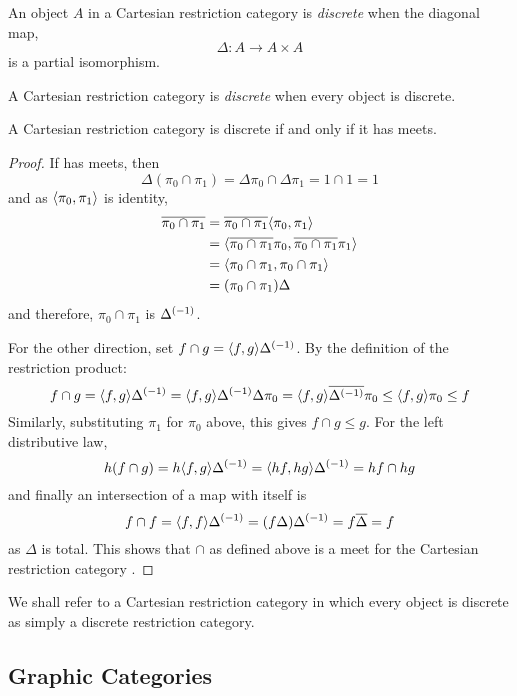 \begin{definition}
  An object $A$ in a Cartesian restriction category is \emph{discrete}
  when the diagonal map,
  \[
    \Delta:A \to A \times A
  \]
  is a partial isomorphism.

  A Cartesian restriction category is \emph{discrete} when every object is discrete.
\end{definition}

\begin{theorem}\label{thm:a_crc_is_discrete_iff_it_has_meets}
  A Cartesian restriction category \X is discrete if and only if it has meets.
\end{theorem}
\begin{proof}
  If \X has meets, then
  \[
    \Delta(\pi_0 \cap \pi_1) = \Delta\pi_0 \cap \Delta\pi_1 = 1\cap 1 = 1
  \]
  and as $\langle\pi_0,\pi_1\rangle$ is identity,
  \begin{align*}
    \overline{\pi_0 \cap \pi_1} &= \overline{\pi_0 \cap \pi_1} \langle\pi_0, \pi_1\rangle \\
    &=\langle\overline{\pi_0 \cap \pi_1}\pi_0, \overline{\pi_0 \cap \pi_1}\pi_1\rangle\\
    &=\langle\pi_0 \cap \pi_1,\pi_0 \cap \pi_1\rangle\\
    &=(\pi_0 \cap \pi_1 )\Delta
  \end{align*}
  and therefore, $\pi_0 \cap \pi_1$ is ${\Delta}^{(-1)}$.

  For the other direction, set $f\cap g = \langle f,g\rangle{\Delta}^{(-1)}$.
  By the definition of the restriction product:
  \[
    f \cap g =  \langle f,g\rangle{\Delta}^{(-1)} =\langle f,g\rangle{\Delta}^{(-1)} \Delta \pi_0 =
      \langle f,g\rangle\overline{{\Delta}^{(-1)}}\pi_0 \le \langle f,g\rangle\pi_0 \le f
  \]
  Similarly, substituting $\pi_1$ for $\pi_0$ above, this gives $f \cap g \le g$.
  For the left distributive law,
  \[
    h(f \cap g) = h \langle f,g\rangle{\Delta}^{(-1)} =  \langle h f,h g\rangle{\Delta}^{(-1)} = h f \cap h g
  \]
  and finally an intersection of a map with itself is
  \[
    f\cap f = \langle f,f\rangle {\Delta}^{(-1)} = (f \Delta) {\Delta}^{(-1)} = f \overline{\Delta} = f 
  \]
  as $\Delta$ is total. This shows that $\cap$ as defined above is a meet for the
  Cartesian restriction category \X.

\end{proof}

We shall refer to a Cartesian restriction category in which every object is
discrete as simply a discrete restriction category.

\subsection{Graphic Categories} %
\label{sub:graphic_categories}


